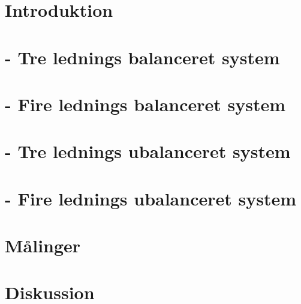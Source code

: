 \documentclass[a4paper,oneside,article]{memoir}
\begin{document}

\renewcommand\contentsname{Indholdsfortegnelse}
\tableofcontents*
\newpage
\chapter{Introduktion} 

\newpage
\chapter{- Tre lednings balanceret system}

\newpage
\chapter{- Fire lednings balanceret system}

\newpage
\chapter{- Tre lednings ubalanceret system}

\newpage
\chapter{- Fire lednings ubalanceret system}

\newpage
\chapter{Målinger}

\chapter{Diskussion}

\end{document}
